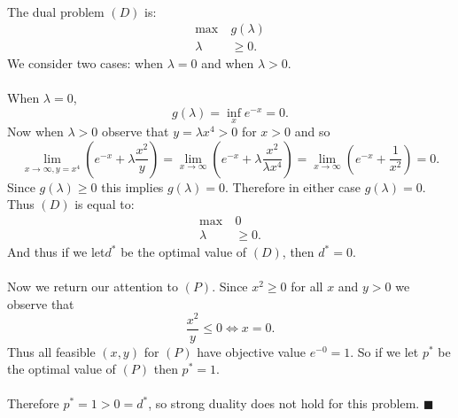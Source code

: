 \documentclass[letterpaper,12pt,oneside,onecolumn]{article}
\begin{document}
\paragraph{}
The dual problem $(D)$ is:
\begin{align*}
\max\ &g(\lambda) \\
\lambda &\geq 0.
\end{align*}
We consider two cases: when $\lambda = 0$ and when $\lambda > 0$.
\paragraph{}
When $\lambda = 0$, 
$$g(\lambda) = \inf_x e^{-x} = 0.$$
Now when $\lambda > 0$ observe that $y = \lambda x^4 > 0$ for $x > 0$ and so
$$\lim_{x \rightarrow \infty, y=x^4} (e^{-x} + \lambda\frac{x^2}{y}) = \lim_{x\rightarrow \infty} (e^{-x} + \lambda\frac{x^2}{\lambda x^4}) = \lim_{x\rightarrow \infty}( e^{-x} + \frac{1}{x^2}) = 0.$$
Since $g(\lambda) \geq 0$ this implies $g(\lambda) = 0$. Therefore in either case $g(\lambda) = 0$. Thus $(D)$ is equal to:
\begin{align*}
\max\ &0 \\
\lambda &\geq 0.
\end{align*}
And thus if we let$d^*$ be the optimal value of $(D)$, then $d^*=0$.
\paragraph{}
Now we return our attention to $(P)$. Since $x^2 \geq 0$ for all $x$ and $y > 0$ we observe that
$$\frac{x^2}{y} \leq 0 \iff x = 0.$$
Thus all feasible $(x,y)$ for $(P)$ have objective value $e^{-0} = 1$. So if we let $p^*$ be the optimal value of $(P)$ then $p^* = 1$.
\paragraph{}
Therefore $p^* = 1 > 0 = d^*$, so strong duality does not hold for this problem. $\blacksquare$
\end{document}
